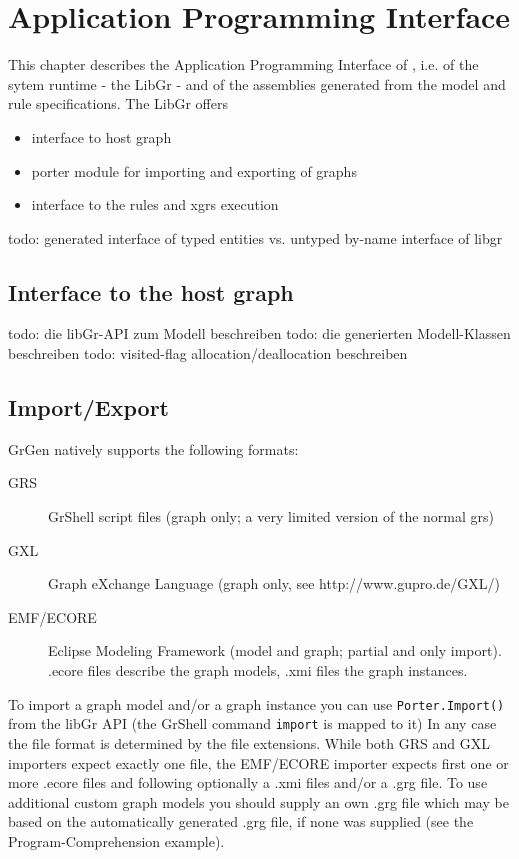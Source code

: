 \chapter{Application Programming Interface}
\label{chapapi}

This chapter describes the Application Programming Interface of \GrG, i.e. of the sytem runtime - the LibGr - and of the assemblies generated from the model and rule specifications.
The LibGr offers
\begin{itemize}
\item interface to host graph
\item porter module for importing and exporting of graphs
\item interface to the rules and xgrs execution
\end{itemize}

todo: generated interface of typed entities vs. untyped by-name interface of libgr

\section{Interface to the host graph}

todo: die libGr-API zum Modell beschreiben
todo: die generierten Modell-Klassen beschreiben
todo: visited-flag allocation/deallocation beschreiben\label{apiallocvisitflag}


\section{Import/Export}\label{sub:imexport}

GrGen natively supports the following formats:
\begin{description}
  \item[GRS] GrShell script files (graph only; a very limited version of the normal grs)
  \item[GXL] Graph eXchange Language (graph only, see http://www.gupro.de/GXL/)
  \item[EMF/ECORE] Eclipse Modeling Framework (model and graph; partial and only import).
      .ecore files describe the graph models, .xmi files the graph instances.
\end{description}

To import a graph model and/or a graph instance you can use
\verb#Porter.Import()# from the libGr API (the GrShell command \verb#import# is mapped to it)
In any case the file format is determined by the file extensions.
While both GRS and GXL importers expect exactly one file, the EMF/ECORE importer
expects first one or more .ecore files and following optionally a .xmi files and/or
a .grg file. To use additional custom graph models you should supply an own .grg
file which may be based on the automatically generated .grg file, if none was
supplied (see the Program-Comprehension example).

